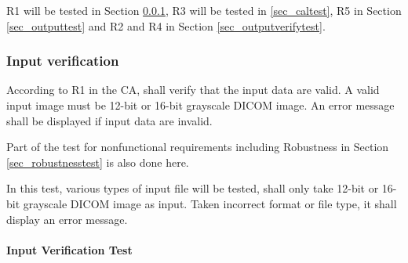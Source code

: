 \documentclass[12pt, titlepage]{article}
\begin{document}
R1 will be tested in Section \ref{sec_inputtest}, R3 will be tested in \ref{sec_caltest}, R5 in Section \ref{sec_outputtest} and R2 and R4 in Section \ref{sec_outputverifytest}.

\subsubsection{Input verification}
\label{sec_inputtest}

According to R1 in the CA, \progname{} shall verify that the input data are valid. A valid input image must be 12-bit or 16-bit grayscale DICOM image. An error message shall be displayed if input data are invalid.

Part of the test for nonfunctional requirements including Robustness in Section \ref{sec_robustnesstest} is also done here.

In this test, various types of input file will be tested, \progname{} shall only take 12-bit or 16-bit grayscale DICOM image as input. Taken incorrect format or file type, it shall display an error message.
		
\paragraph{Input Verification Test}
\end{document}
